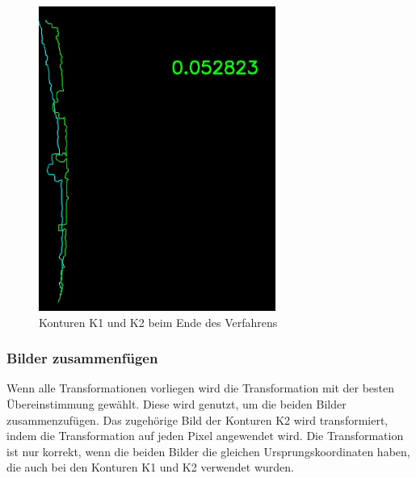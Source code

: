 \documentclass[../main.tex]{subfiles}
\begin{document}
\begin{figure}[h]
\begin{minipage}{0.24\textwidth}
        \includegraphics[width=\textwidth]{images/stitching_end.PNG} %
        \caption{Konturen K1 und K2 beim Ende des Verfahrens}
        \label{fig:stitching_end}
    \end{minipage}\hfill
\end{figure}

\subsubsection*{Bilder zusammenfügen}

Wenn alle Transformationen vorliegen wird die Transformation mit der besten 
Übereinstimmung gewählt. Diese wird genutzt, um die beiden Bilder zusammenzufügen.
Das zugehörige Bild der Konturen K2 wird transformiert, indem die Transformation 
auf jeden Pixel angewendet wird.  
Die Transformation ist nur korrekt, wenn die beiden Bilder die gleichen 
Ursprungskoordinaten haben, die auch bei den Konturen K1 und K2 verwendet wurden.
\end{document}
